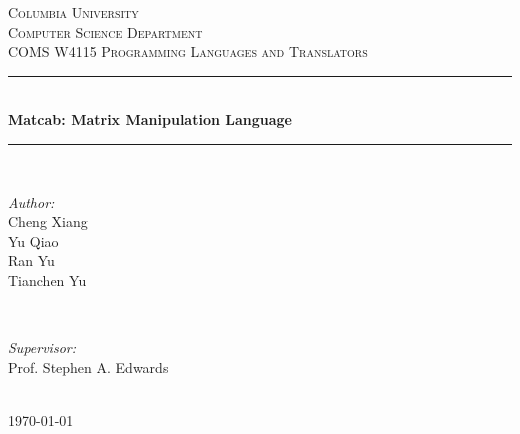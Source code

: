 \documentclass[12pt]{article} %
\begin{document}

\begin{titlepage}

\newcommand{\HRule}{\rule{\linewidth}{0.5mm}} %

\center %

\textsc{\LARGE Columbia University}\\[1.5cm] %
\textsc{\Large Computer Science Department}\\[0.5cm] %
\textsc{\large COMS W4115 Programming Languages and Translators}\\[0.5cm] %

\HRule \\[0.4cm]
{ \huge \bfseries Matcab: Matrix Manipulation Language}\\[0.4cm] %
\HRule \\[1.5cm]

\begin{minipage}{0.4\textwidth}
\begin{flushleft} \large
\emph{Author:}\\
Cheng Xiang \\ Yu Qiao \\ Ran Yu \\ Tianchen Yu %
\end{flushleft}
\end{minipage}
~
\begin{minipage}{0.4\textwidth}
\begin{flushright} \large
\emph{Supervisor:} \\
Prof. Stephen A. Edwards\ %
\end{flushright}
\end{minipage}\\[4cm]

{\large \today}\\[3cm] %



\vfill %

\end{titlepage}
\end{document}
